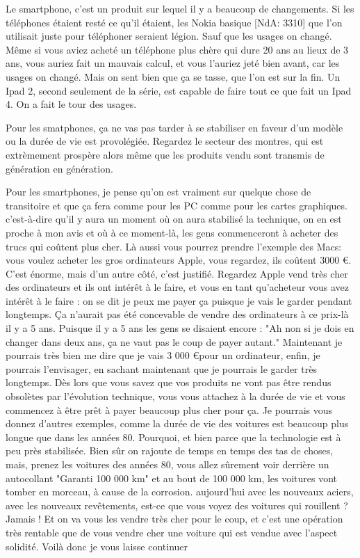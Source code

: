 \begin{small}
Le smartphone, c'est un produit sur lequel il y a beaucoup de changements. Si les téléphones étaient resté ce qu'il étaient, les Nokia basique [NdA: 3310] que l'on utilisait juste pour téléphoner seraient légion. Sauf que les usages on changé. Même si vous aviez acheté un téléphone plus chère qui dure 20 ans au lieux de 3 ans, vous auriez fait un mauvais calcul, et vous l'auriez jeté bien avant, car les usages on changé. Mais on sent bien que ça se tasse, que l'on est sur la fin. Un Ipad 2, second seulement de la série, est capable de faire tout ce que fait un Ipad 4. On a fait le tour des usages.

Pour les smatphones, ça ne vas pas tarder à se stabiliser en faveur d'un modèle ou la durée de vie est provolégiée. Regardez le secteur des montres, qui est extrèmement prospère alors même que les produits vendu sont transmis de génération en génération.

Pour les smartphones, je pense qu'on est vraiment sur quelque chose de transitoire et que ça fera comme pour les PC comme pour les cartes graphiques. c'est-à-dire qu'il y aura un moment où on aura stabilisé la technique, on en est proche à mon avis et où à ce moment-là, les gens commenceront à acheter des trucs qui coûtent plus cher. Là aussi vous pourrez prendre l'exemple des Macs: vous voulez acheter les gros ordinateurs Apple, vous regardez, ils coûtent 3000 \euro. C'est énorme, mais d'un autre côté, c'est justifié. Regardez Apple vend très cher des ordinateurs et ils ont intérêt à le faire, et vous en tant qu'acheteur vous avez intérêt à le faire : on se dit je peux me payer ça puisque je vais le garder pendant longtemps. Ça n'aurait pas été concevable de vendre des ordinateurs à ce prix-là il y a 5 ans. Puisque il y a 5 ans les gens se disaient encore : "Ah non si je dois en changer dans deux ans, ça ne vaut pas le coup de payer autant." Maintenant je pourrais très bien me dire que je vais 3 000 \euro pour un ordinateur, enfin, je pourrais l'envisager, en sachant maintenant que je pourrais le garder très longtemps. Dès lors que vous savez que vos produits ne vont pas être rendus obsolètes par l'évolution technique, vous vous attachez à la durée de vie et vous commencez à être prêt à payer beaucoup plus cher pour ça. 
Je pourrais vous donnez d'autres exemples, comme la durée de vie des voitures est beaucoup plus longue que dans les années 80. Pourquoi, et bien parce que la technologie est à peu près stabilisée. Bien sûr on rajoute de temps en temps des tas de choses, mais, prenez les voitures des années 80, vous allez sûrement voir derrière un autocollant "Garanti 100 000 km" et au bout de 100 000 km, les voitures vont tomber en morceau, à cause de la corrosion. aujourd'hui avec les nouveaux aciers, avec les nouveaux revêtements, est-ce que vous voyez des voitures qui rouillent ? Jamais ! Et on va vous les vendre très cher pour le coup, et c'est une opération très rentable que de vous vendre cher une voiture qui est vendue avec l'aspect solidité.
Voilà donc je vous laisse continuer




\end{small}
